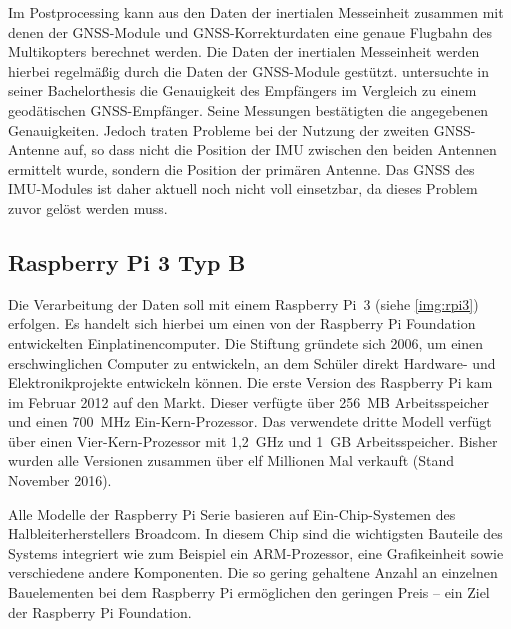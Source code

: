 \documentclass[a4paper,12pt,bibliography=totoc, listof=totoc,titlepage,pointlessnumbers]{scrreprt}
\begin{document}
Im Postprocessing kann aus den Daten der inertialen Messeinheit zusammen mit denen der GNSS-Module und GNSS-Korrekturdaten eine genaue Flugbahn des Multikopters berechnet werden. Die Daten der inertialen Messeinheit werden hierbei regelmäßig durch die Daten der GNSS-Module gestützt.
\citet{wilken} untersuchte in seiner Bachelorthesis die Genauigkeit des Empfängers im Vergleich zu einem geodätischen GNSS-Empfänger. Seine Messungen bestätigten die angegebenen Genauigkeiten. Jedoch traten Probleme bei der Nutzung der zweiten GNSS-Antenne auf, so dass nicht die Position der IMU zwischen den beiden Antennen ermittelt wurde, sondern die Position der primären Antenne. Das GNSS des IMU-Modules ist daher aktuell noch nicht voll einsetzbar, da dieses Problem zuvor gelöst werden muss.

\subsection{Rasp\-berry Pi 3 Typ B}
\label{ss:Raspberry}
Die Verarbeitung der Daten soll mit einem Rasp\-berry Pi~3 (siehe \autoref{img:rpi3}) erfolgen. Es handelt sich hierbei um einen von der Rasp\-berry Pi Foundation entwickelten Einplatinencomputer. Die Stiftung gründete sich 2006, um einen erschwinglichen Computer zu entwickeln, an dem Schüler direkt Hardware- und Elektronikprojekte entwickeln können. Die erste Version des Rasp\-berry Pi kam im Februar 2012 auf den Markt. Dieser verfügte über 256~MB Arbeitsspeicher und einen 700~MHz Ein-Kern-Prozessor. Das verwendete dritte Modell verfügt über einen Vier-Kern-Prozessor mit 1,2~GHz und 1~GB Arbeitsspeicher. Bisher wurden alle Versionen zusammen über elf Millionen Mal verkauft (Stand November 2016). \citep{heise5Rasp}

Alle Modelle der Rasp\-berry Pi Serie basieren auf Ein-Chip-Systemen des Halbleiterherstellers Broadcom. In diesem Chip sind die wichtigsten Bauteile des Systems integriert wie zum Beispiel ein ARM-Prozessor, eine Grafikeinheit sowie verschiedene andere Komponenten. Die so gering gehaltene Anzahl an einzelnen Bauelementen bei dem Rasp\-berry Pi ermöglichen den geringen Preis -- ein Ziel der Rasp\-berry Pi Foundation. 
\end{document}
